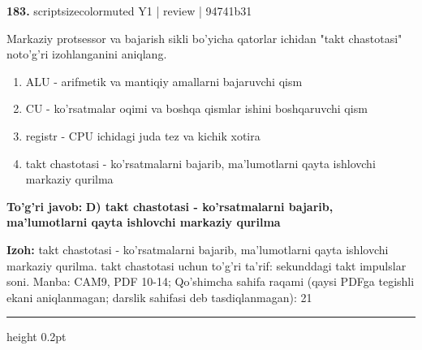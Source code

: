 \documentclass[10pt,a4paper]{article}
\begin{document}
{\bfseries\sffamily\color{ink} 183.} {scriptsizecolor{muted} Y1 | review | 94741b31}
\par
Markaziy protsessor va bajarish sikli bo'yicha qatorlar ichidan "takt chastotasi" noto'g'ri izohlanganini aniqlang.
\begin{enumerate}[label=\Alph*),leftmargin=9mm]
\item ALU - arifmetik va mantiqiy amallarni bajaruvchi qism
\item CU - ko'rsatmalar oqimi va boshqa qismlar ishini boshqaruvchi qism
\item registr - CPU ichidagi juda tez va kichik xotira
\item takt chastotasi - ko'rsatmalarni bajarib, ma'lumotlarni qayta ishlovchi markaziy qurilma
\end{enumerate}
\begin{tcolorbox}[enhanced,breakable,colback=teal!4,colframe=teal!60!black,boxrule=0.45pt,arc=1.2mm,left=2.7mm,right=2.7mm,top=1.8mm,bottom=1.8mm,before skip=2mm,after skip=2mm]
{\bfseries\sffamily\color{teal}To'g'ri javob:} \textbf{D) takt chastotasi - ko'rsatmalarni bajarib, ma'lumotlarni qayta ishlovchi markaziy qurilma}
\par\smallskip
{\bfseries Izoh:} takt chastotasi - ko'rsatmalarni bajarib, ma'lumotlarni qayta ishlovchi markaziy qurilma. takt chastotasi uchun to'g'ri ta'rif: sekunddagi takt impulslar soni. Manba: CAM9, PDF 10-14; Qo'shimcha sahifa raqami (qaysi PDFga tegishli ekani aniqlanmagan; darslik sahifasi deb tasdiqlanmagan): 21
\end{tcolorbox}
\vspace{2mm}\hrule height 0.2pt\vspace{3mm}
\end{document}
